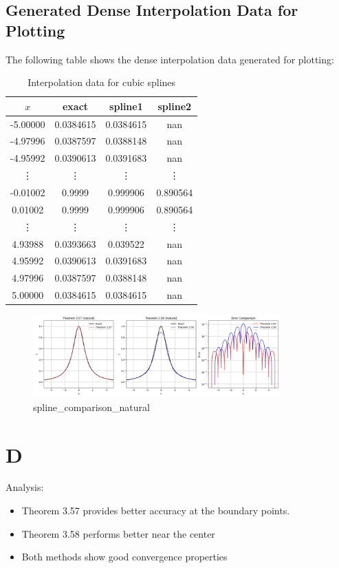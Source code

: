 \documentclass[a4paper]{article}
\begin{document}
\subsection*{Generated Dense Interpolation Data for Plotting}
The following table shows the dense interpolation data generated for plotting:

\begin{table}[h!]
\centering
\begin{tabular}{|c|c|c|c|}
\hline
$x$ & exact & spline1 & spline2 \\
\hline
-5.00000 & 0.0384615 & 0.0384615 & nan \\
-4.97996 & 0.0387597 & 0.0388148 & nan \\
-4.95992 & 0.0390613 & 0.0391683 & nan \\
\vdots & \vdots & \vdots & \vdots \\
-0.01002   & 0.9999    & 0.999906  & 0.890564 \\
0.01002    & 0.9999    & 0.999906  & 0.890564 \\
\vdots  & \vdots  & \vdots  & \vdots \\
4.93988    & 0.0393663 & 0.039522  & nan \\
4.95992    & 0.0390613 & 0.0391683 & nan \\
4.97996    & 0.0387597 & 0.0388148 & nan \\
5.00000    & 0.0384615 & 0.0384615 & nan \\
\hline
\end{tabular}
\caption{Interpolation data for cubic splines}
\end{table}

\begin{figure}[H]
    \centering
    \includegraphics[width=0.85\textwidth]{figure/spline_comparison_natural.png}
    \caption{spline\_comparison\_natural}
    \label{fig:spline_comparison_natural}
\end{figure}

\section*{D}
Analysis:
\begin{itemize}
    \item Theorem 3.57 provides better accuracy at the boundary points.
    \item Theorem 3.58 performs better near the center
    \item Both methods show good convergence properties
\end{itemize}
\end{document}
